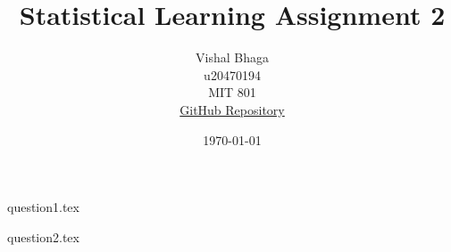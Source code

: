 \documentclass[11pt,a4paper]{article}
\title{Statistical Learning Assignment 2}
\author{
    Vishal Bhaga\\
    u20470194\\
    MIT 801\\
    \href{https://github.com/vbhaga89/MIT801_SL_Assignment2}{GitHub Repository}
}
\date{\today}
\begin{document}
\onehalfspacing

\maketitle

{question1.tex}

\newpage

{question2.tex}

\newpage

\printbibliography
\end{document}
